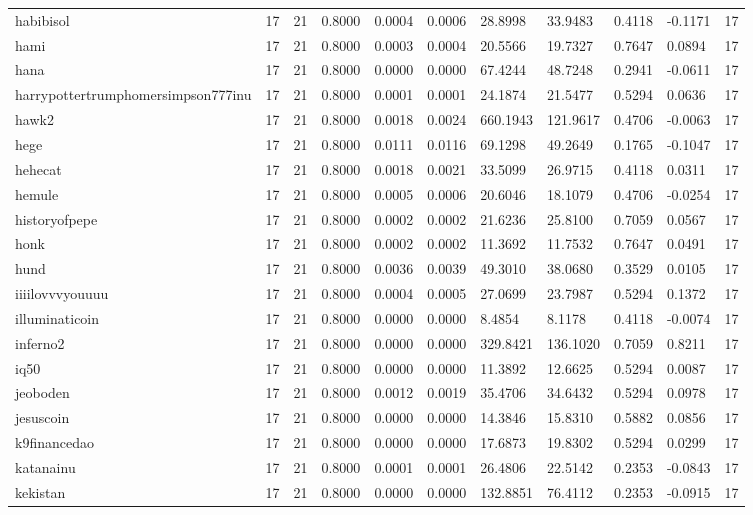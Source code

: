 \begin{table}[htbp]
\begin{tabular}{lllllllllll}
habibisol & 17 & 21 & 0.8000 & 0.0004 & 0.0006 & 28.8998 & 33.9483 & 0.4118 & -0.1171 & 17 \\
hami & 17 & 21 & 0.8000 & 0.0003 & 0.0004 & 20.5566 & 19.7327 & 0.7647 & 0.0894 & 17 \\
hana & 17 & 21 & 0.8000 & 0.0000 & 0.0000 & 67.4244 & 48.7248 & 0.2941 & -0.0611 & 17 \\
harrypottertrumphomersimpson777inu & 17 & 21 & 0.8000 & 0.0001 & 0.0001 & 24.1874 & 21.5477 & 0.5294 & 0.0636 & 17 \\
hawk2 & 17 & 21 & 0.8000 & 0.0018 & 0.0024 & 660.1943 & 121.9617 & 0.4706 & -0.0063 & 17 \\
hege & 17 & 21 & 0.8000 & 0.0111 & 0.0116 & 69.1298 & 49.2649 & 0.1765 & -0.1047 & 17 \\
hehecat & 17 & 21 & 0.8000 & 0.0018 & 0.0021 & 33.5099 & 26.9715 & 0.4118 & 0.0311 & 17 \\
hemule & 17 & 21 & 0.8000 & 0.0005 & 0.0006 & 20.6046 & 18.1079 & 0.4706 & -0.0254 & 17 \\
historyofpepe & 17 & 21 & 0.8000 & 0.0002 & 0.0002 & 21.6236 & 25.8100 & 0.7059 & 0.0567 & 17 \\
honk & 17 & 21 & 0.8000 & 0.0002 & 0.0002 & 11.3692 & 11.7532 & 0.7647 & 0.0491 & 17 \\
hund & 17 & 21 & 0.8000 & 0.0036 & 0.0039 & 49.3010 & 38.0680 & 0.3529 & 0.0105 & 17 \\
iiiilovvvyouuuu & 17 & 21 & 0.8000 & 0.0004 & 0.0005 & 27.0699 & 23.7987 & 0.5294 & 0.1372 & 17 \\
illuminaticoin & 17 & 21 & 0.8000 & 0.0000 & 0.0000 & 8.4854 & 8.1178 & 0.4118 & -0.0074 & 17 \\
inferno2 & 17 & 21 & 0.8000 & 0.0000 & 0.0000 & 329.8421 & 136.1020 & 0.7059 & 0.8211 & 17 \\
iq50 & 17 & 21 & 0.8000 & 0.0000 & 0.0000 & 11.3892 & 12.6625 & 0.5294 & 0.0087 & 17 \\
jeoboden & 17 & 21 & 0.8000 & 0.0012 & 0.0019 & 35.4706 & 34.6432 & 0.5294 & 0.0978 & 17 \\
jesuscoin & 17 & 21 & 0.8000 & 0.0000 & 0.0000 & 14.3846 & 15.8310 & 0.5882 & 0.0856 & 17 \\
k9financedao & 17 & 21 & 0.8000 & 0.0000 & 0.0000 & 17.6873 & 19.8302 & 0.5294 & 0.0299 & 17 \\
katanainu & 17 & 21 & 0.8000 & 0.0001 & 0.0001 & 26.4806 & 22.5142 & 0.2353 & -0.0843 & 17 \\
kekistan & 17 & 21 & 0.8000 & 0.0000 & 0.0000 & 132.8851 & 76.4112 & 0.2353 & -0.0915 & 17 \\

\end{tabular}
\end{table}
